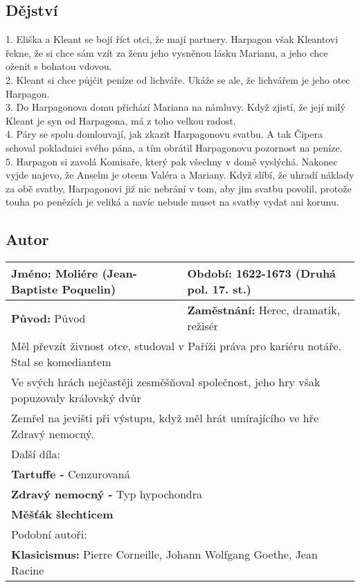 \subsection*{Dějství}
1. Eliška a Kleant se bojí říct otci, že mají partnery.
Harpagon však Kleantovi řekne, že si chce sám vzít za ženu jeho vysněnou lásku Marianu, a jeho chce oženit s bohatou vdovou. \\
2. Kleant si chce půjčit peníze od lichváře.
Ukáže se ale, že lichvářem je jeho otec Harpagon. \\
3. Do Harpagonova domu přichází Mariana na námluvy.
Když zjistí, že její milý Kleant je syn od Harpagona, má z toho velkou radost. \\
4. Páry se spolu domlouvají, jak zkazit Harpagonovu svatbu.
A tak Čipera schoval pokladnici svého pána, a tím obrátil Harpagonovu pozornost na peníze. \\
5. Harpagon si zavolá Komisaře, který pak všechny v domě vyslýchá.
Nakonec vyjde najevo, že Anselm je otcem Valéra a Mariany.
Když slíbí, že uhradí náklady za obě svatby, Harpagonovi již nic nebrání v tom, aby jim svatbu povolil, protože touha po penězích je veliká a navíc nebude muset na svatby vydat ani korunu.
\subsection*{Autor}
\begin{tabularx}{\linewidth}{l|l}
    \textbf{Jméno:} Moliére (Jean-Baptiste Poquelin) & \textbf{Období:} 1622-1673  (Druhá pol. 17. st.)     \\
    \hline
    \textbf{Původ:} Původ                            & \textbf{Zaměstnání:} Herec, dramatik, režisér              \\
    \hline
    \multicolumn{2}{l}{Měl převzít živnost otce, studoval v Paříži práva pro kariéru notáře. Stal se komediantem} \\
    \multicolumn{2}{l}{Ve svých hrách nejčastěji zesměšňoval společnost, jeho hry však popuzovaly královský dvůr} \\
    \multicolumn{2}{l}{Zemřel na jevišti při výstupu, když měl hrát umírajícího ve hře Zdravý nemocný.}           \\
    \hline
    \multicolumn{2}{l}{Další díla:}                                                                               \\
    \multicolumn{2}{l}{\textbf{Tartuffe -} Cenzurovaná}                                                           \\
    \multicolumn{2}{l}{\textbf{Zdravý nemocný -} Typ hypochondra}                                                 \\
    \multicolumn{2}{l}{\textbf{Měšťák šlechticem}}                                                                \\
    \hline
    \multicolumn{2}{l}{Podobní autoři:}                                                                           \\
    \multicolumn{2}{l}{\textbf{Klasicismus:} Pierre Corneille, Johann Wolfgang Goethe, Jean Racine}               \\
\end{tabularx}
